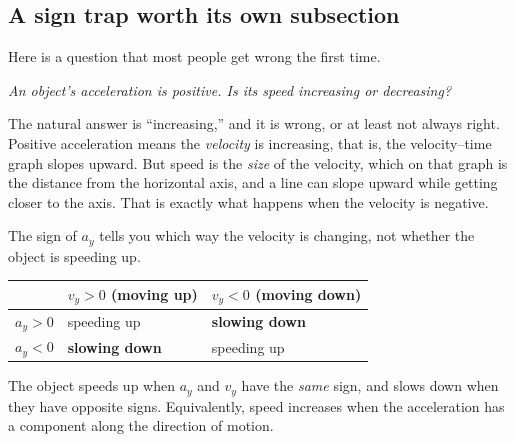 \documentclass[11pt,twoside,openany]{book}
\begin{document}
\subsection{A sign trap worth its own subsection}

Here is a question that most people get wrong the first time.

\emph{An object's acceleration is positive. Is its speed increasing or decreasing?}

The natural answer is ``increasing,'' and it is wrong, or at least not always right. Positive acceleration means the \emph{velocity} is increasing, that is, the velocity--time graph slopes upward. But speed is the \emph{size} of the velocity, which on that graph is the distance from the horizontal axis, and a line can slope upward while getting closer to the axis. That is exactly what happens when the velocity is negative.

\begin{keyidea}
The sign of $a_y$ tells you which way the velocity is changing, not whether the object is speeding up.
\begin{center}
\renewcommand{\arraystretch}{1.25}
\begin{tabular}{lll}
\toprule
 & $v_y > 0$ (moving up) & $v_y < 0$ (moving down) \\
\midrule
$a_y > 0$ & speeding up & \textbf{slowing down} \\
$a_y < 0$ & \textbf{slowing down} & speeding up \\
\bottomrule
\end{tabular}
\end{center}
The object speeds up when $a_y$ and $v_y$ have the \emph{same} sign, and slows down when they have opposite signs. Equivalently, speed increases when the acceleration has a component along the direction of motion.
\end{keyidea}
\end{document}

